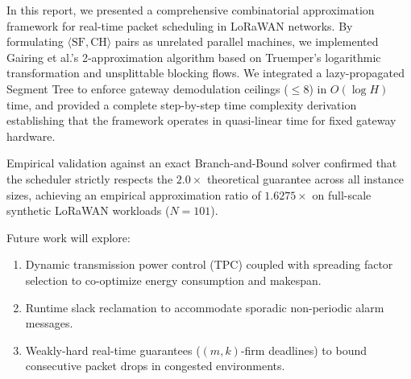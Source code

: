\documentclass{article}
\begin{document}
In this report, we presented a comprehensive combinatorial approximation framework for real-time packet scheduling in LoRaWAN networks. By formulating $\langle \text{SF}, \text{CH} \rangle$ pairs as unrelated parallel machines, we implemented Gairing et al.'s 2-approximation algorithm based on Truemper's logarithmic transformation and unsplittable blocking flows. We integrated a lazy-propagated Segment Tree to enforce gateway demodulation ceilings ($\le 8$) in $O(\log H)$ time, and provided a complete step-by-step time complexity derivation establishing that the framework operates in quasi-linear time for fixed gateway hardware.

Empirical validation against an exact Branch-and-Bound solver confirmed that the scheduler strictly respects the $2.0\times$ theoretical guarantee across all instance sizes, achieving an empirical approximation ratio of $1.6275\times$ on full-scale synthetic LoRaWAN workloads ($N = 101$).

Future work will explore:
\begin{enumerate}
    \item Dynamic transmission power control (TPC) coupled with spreading factor selection to co-optimize energy consumption and makespan.
    \item Runtime slack reclamation to accommodate sporadic non-periodic alarm messages.
    \item Weakly-hard real-time guarantees ($(m, k)$-firm deadlines) to bound consecutive packet drops in congested environments.
\end{enumerate}



\end{document}

